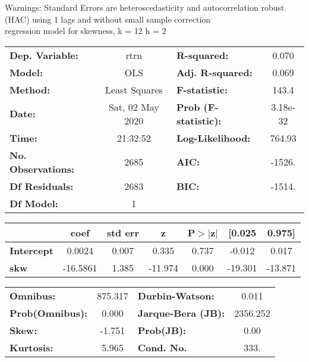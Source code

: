 Warnings: \newline
 [1] Standard Errors are heteroscedasticity and autocorrelation robust (HAC) using 1 lags and without small sample correction\\ 

regression model for skewness, k = 12 h = 2\begin{center}
\begin{tabular}{lclc}
\toprule
\textbf{Dep. Variable:}    &       rtrn       & \textbf{  R-squared:         } &     0.070   \\
\textbf{Model:}            &       OLS        & \textbf{  Adj. R-squared:    } &     0.069   \\
\textbf{Method:}           &  Least Squares   & \textbf{  F-statistic:       } &     143.4   \\
\textbf{Date:}             & Sat, 02 May 2020 & \textbf{  Prob (F-statistic):} &  3.18e-32   \\
\textbf{Time:}             &     21:32:52     & \textbf{  Log-Likelihood:    } &    764.93   \\
\textbf{No. Observations:} &        2685      & \textbf{  AIC:               } &    -1526.   \\
\textbf{Df Residuals:}     &        2683      & \textbf{  BIC:               } &    -1514.   \\
\textbf{Df Model:}         &           1      & \textbf{                     } &             \\
\bottomrule
\end{tabular}
\begin{tabular}{lcccccc}
                   & \textbf{coef} & \textbf{std err} & \textbf{z} & \textbf{P$> |$z$|$} & \textbf{[0.025} & \textbf{0.975]}  \\
\midrule
\textbf{Intercept} &       0.0024  &        0.007     &     0.335  &         0.737        &       -0.012    &        0.017     \\
\textbf{skw}       &     -16.5861  &        1.385     &   -11.974  &         0.000        &      -19.301    &      -13.871     \\
\bottomrule
\end{tabular}
\begin{tabular}{lclc}
\textbf{Omnibus:}       & 875.317 & \textbf{  Durbin-Watson:     } &    0.011  \\
\textbf{Prob(Omnibus):} &   0.000 & \textbf{  Jarque-Bera (JB):  } & 2356.252  \\
\textbf{Skew:}          &  -1.751 & \textbf{  Prob(JB):          } &     0.00  \\
\textbf{Kurtosis:}      &   5.965 & \textbf{  Cond. No.          } &     333.  \\
\bottomrule
\end{tabular}
\end{center}

